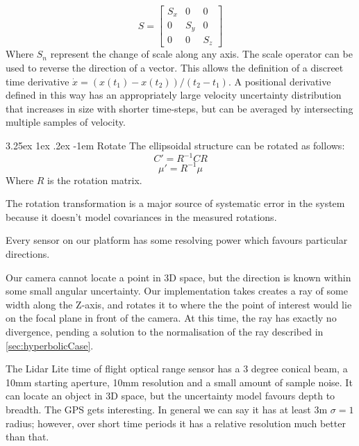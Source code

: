 \documentclass{article}
\makeatletter
\newcounter{subsubsubsection}[subsubsection]
\renewcommand\paragraph{\@startsection{paragraph}{5}{\z@}%
  {3.25ex \@plus1ex \@minus.2ex}%
  {-1em}%
  {\normalfont\normalsize\bfseries}}
\makeatother
\begin{document}
        \begin{equation}
        S=\begin{bmatrix}
          S_x & 0 & 0 \\[0.3em]
          0 & S_y & 0 \\[0.3em]
          0 & 0 & S_z
        \end{bmatrix}
        \end{equation}
        Where \(S_n\) represent the change of scale along any axis.
        The scale operator can be used to reverse the direction of a vector.  This allows the definition of a discreet time derivative \(\dot{x} = (x(t_1) - x(t_2))/(t_2-t_1)\).  A positional derivative defined in this way has an appropriately large velocity uncertainty distribution that increases in size with shorter time-steps, but can be averaged by intersecting multiple samples of velocity.

        \paragraph{Rotate}
        The ellipsoidal structure can be rotated as follows:
        \begin{equation}
        C' = R^{-1} C R
        \end{equation}
        \begin{equation}
        \mu' = R^{-1} \mu
        \end{equation}
        Where \(R\) is the rotation matrix.

        The rotation transformation is a major source of systematic error in the system because it doesn't model covariances in the measured rotations. %

        Every sensor on our platform has some resolving power which favours particular directions.

        Our camera cannot locate a point in 3D space, but the direction is known within some small angular uncertainty.
        Our implementation takes creates a ray of some width along the Z-axis, and rotates it to where the the point of interest would lie on the focal plane in front of the camera.  At this time, the ray has exactly no divergence, pending a solution to the normalisation of the ray described in \ref{sec:hyperbolicCase}.

        The Lidar Lite time of flight optical range sensor has a 3 degree conical beam, a 10mm starting aperture, 10mm resolution and a small amount of sample noise. It can locate an object in 3D space, but the uncertainty model favours depth to breadth.
        The GPS gets interesting.  In general we can say it has at least 3m \(\sigma=1\) radius; however, over short time periods it has a relative resolution much better than that.
\end{document}
